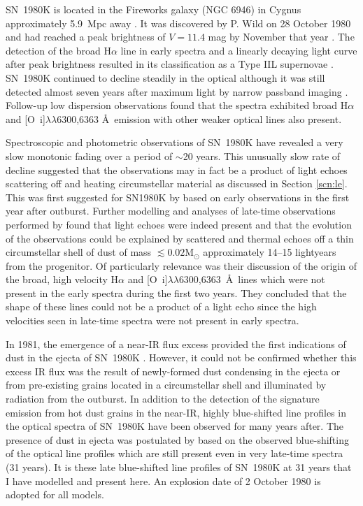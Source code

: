 SN~1980K is located in the Fireworks galaxy (NGC 6946) in Cygnus approximately 5.9~Mpc away \citep{Karachentsev2000}.  It was discovered by P. Wild on  28 October 1980 and  had reached a peak brightness of $V=11.4$ mag by November that year \citep{Buta1982}.   The detection of the broad H$\alpha$ line in early spectra and a linearly decaying light curve after peak brightness resulted in its classification as a Type IIL supernovae \citep{Barbon1982}.  SN~1980K continued to decline steadily in the optical although it was still detected almost seven years after maximum light by narrow passband imaging \citep{Fesen1988}.  Follow-up low dispersion observations found that the spectra exhibited broad H$\alpha$ and [O~{\sc i}]$\lambda\lambda$6300,6363 \AA\  emission with other weaker optical lines also present.  

Spectroscopic and photometric observations of SN~1980K have revealed a very slow monotonic fading over a period of $\sim$20 years.  This unusually slow rate of decline suggested that the observations may in fact be a product of light echoes scattering off  and heating circumstellar material as discussed in Section \ref{scn:le}.  This was first suggested for SN1980K by \citet{Chevalier1986} based on early observations in the first year after outburst.  Further modelling and analyses of late-time observations performed by \citet{Sugerman2012}  found that light echoes were indeed present and that the evolution of the observations could be explained by scattered and thermal echoes off a thin circumstellar shell of dust of mass $\lesssim 0.02$M$_{\odot}$ approximately 14--15 lightyears from the progenitor.  Of particularly relevance was their discussion of the origin of the broad, high velocity H$\alpha$ and [O~{\sc i}]$\lambda\lambda$6300,6363~\AA\ lines which were not present in the early spectra during the first two years.  They concluded that the shape of these lines could not be a product of a light echo since the high velocities seen in late-time spectra were not present in early spectra.

In 1981, the emergence of a near-IR flux excess provided the first indications of dust in the ejecta of SN~1980K \citep{Dwek1983}.  However, it could not be confirmed whether this excess IR flux was the result of newly-formed dust condensing in the ejecta or from pre-existing grains located in a circumstellar shell and illuminated by radiation from the outburst.  In addition to the detection of the signature emission from hot dust grains in the near-IR, highly blue-shifted line profiles in the optical spectra of SN~1980K have been observed for many years after\citep{Fesen1990,Fesen1994,Fesen1995,Fesen1999}.  The presence of dust in ejecta was postulated by \citet{Milisavljevic2012} based on the observed blue-shifting of the optical line profiles which are still present even in very late-time spectra (31 years). It is these late blue-shifted line profiles of SN~1980K at 31 years that I have modelled and present here.  An explosion date of 2 October 1980 \citep{Montes1998} is adopted for all models.


